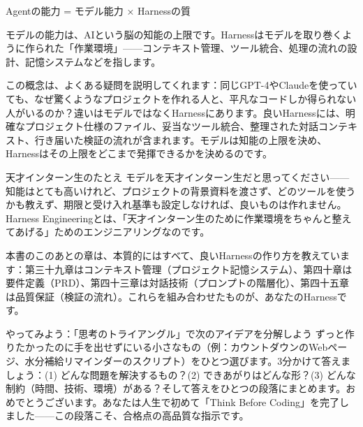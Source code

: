 Agentの能力 = モデル能力 × Harnessの質

モデルの能力は、AIという脳の知能の上限です。Harnessはモデルを取り巻くように作られた「作業環境」——コンテキスト管理、ツール統合、処理の流れの設計、記憶システムなどを指します。

この概念は、よくある疑問を説明してくれます：同じGPT-4やClaudeを使っていても、なぜ驚くようなプロジェクトを作れる人と、平凡なコードしか得られない人がいるのか？違いはモデルではなくHarnessにあります。良いHarnessには、明確なプロジェクト仕様のファイル、妥当なツール統合、整理された対話コンテキスト、行き届いた検証の流れが含まれます。モデルは知能の上限を決め、Harnessはその上限をどこまで発揮できるかを決めるのです。

\begin{tcbinfo}{天才インターン生のたとえ}
モデルを天才インターン生だと思ってください——知能はとても高いけれど、プロジェクトの背景資料を渡さず、どのツールを使うかも教えず、期限と受け入れ基準も設定しなければ、良いものは作れません。Harness Engineeringとは、「天才インターン生のために作業環境をちゃんと整えてあげる」ためのエンジニアリングなのです。

\end{tcbinfo}

本書のこのあとの章は、本質的にはすべて、良いHarnessの作り方を教えています：第三十九章はコンテキスト管理（プロジェクト記憶システム）、第四十章は要件定義（PRD）、第四十三章は対話技術（プロンプトの階層化）、第四十五章は品質保証（検証の流れ）。これらを組み合わせたものが、あなたのHarnessです。

\begin{tcbpractice}{やってみよう：「思考のトライアングル」で次のアイデアを分解しよう}
ずっと作りたかったのに手を出せずにいる小さなもの（例：カウントダウンのWebページ、水分補給リマインダーのスクリプト）をひとつ選びます。3分かけて答えましょう：(1) どんな問題を解決するもの？(2) できあがりはどんな形？(3) どんな制約（時間、技術、環境）がある？そして答えをひとつの段落にまとめます。おめでとうございます。あなたは人生で初めて「Think Before Coding」を完了しました——この段落こそ、合格点の高品質な指示です。

\end{tcbpractice}

